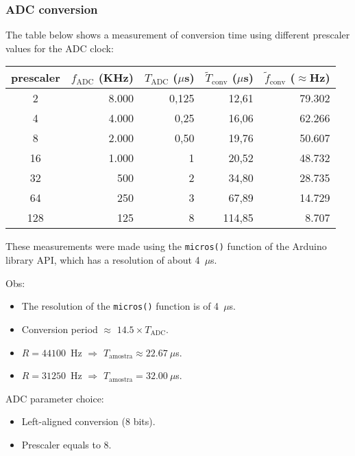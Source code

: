 \subsubsection{ADC conversion}

The table below shows a measurement of conversion time using different
prescaler values for the ADC clock:

\begin{center}
\begin{tabular}{crrrr}
\toprule
\toprule
\footnotesize{prescaler} & \footnotesize{$f_\text{ADC}$ (KHz)} &
\footnotesize{$T_\text{ADC}$ ($\mu$s)} & \footnotesize{$\tilde{T}_\text{conv}$ ($\mu$s)} & \footnotesize{$\tilde{f}_\text{conv}$ ($\approx$Hz)} \\
\midrule
2 & 8.000 & 0,125 & 12,61 & 79.302\\
4 & 4.000 & 0,25 & 16,06  & 62.266 \\
8 & 2.000 & 0,50 & 19,76  & 50.607 \\
16& 1.000 & 1 & 20,52  & 48.732 \\
32& 500 & 2 & 34,80  & 28.735 \\
64& 250 & 3 & 67,89  & 14.729 \\
128& 125 & 8 & 114,85 & 8.707  \\
\bottomrule
\end{tabular}
\end{center}

These measurements were made using the \texttt{micros()} function of the
Arduino library API, which has a resolution of about 4~$\mu$s.

Obs:
\begin{itemize}
  \item The resolution of the \texttt{micros()} function is of 4~$\mu$s.
  \item Conversion period $\approx$ $14.5 \times T_\text{ADC}$. 
  \item $R=44100$~Hz $\Rightarrow$ $T_\text{amostra} \approx 22.67~\mu$s.
  \item $R=31250$~Hz $\Rightarrow$ $T_\text{amostra} = 32.00~\mu$s.
\end{itemize}

ADC parameter choice:

\begin{itemize}
    \item Left-aligned conversion (8 bits).
    \item Prescaler equals to 8.
\end{itemize}

